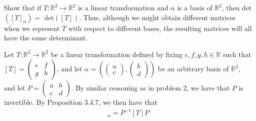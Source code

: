 \documentclass[12pt]{article}
\newenvironment{problem}[2][Problem]
{
	\begin{trivlist} 
		\item[\hskip \labelsep {\bfseries #1 #2:}]
	}
{
	\end{trivlist}
	}
\newenvironment{solution}[1][Solution]
{
	\begin{trivlist} 
		\item[\hskip \labelsep {\itshape #1:}]
	}
	{
	\end{trivlist}
}
\begin{document}
\newpage
\begin{problem}{5}
Show that if $T:\mathbb{R}^2 \to \mathbb{R}^2$ is a linear transformation and $\alpha$ is a basis of $\mathbb{R}^2$, then det$([T]_{\alpha})=$ det$([T])$. Thus, although we might obtain different matrices when we represent $T$ with respect to different bases, the resulting matrices will all have the same determinant.
\noindent
\newline
\newline
\begin{solution}
Let $T:\mathbb{R}^2 \to \mathbb{R}^2$ be a linear transformation defined by fixing $e,f,g,h \in \mathbb{R}$ such that $[T]=\begin{pmatrix}e&f\\g&h\end{pmatrix}$, and let $\alpha=\left(\begin{pmatrix}a\\c\end{pmatrix}, \begin{pmatrix}b\\d\end{pmatrix}\right)$ be an arbitrary basis of $\mathbb{R}^2$, and let $P= \begin{pmatrix} a&b\\c&d\end{pmatrix}$. By similar reasoning as in problem 2, we have that $P$ is invertible. By Proposition 3.4.7, we then have that
\begin{align*}
[T]_{\alpha} = P^{-1} [T] P

\end{align*}
\end{solution}
\end{problem}
\end{document}
